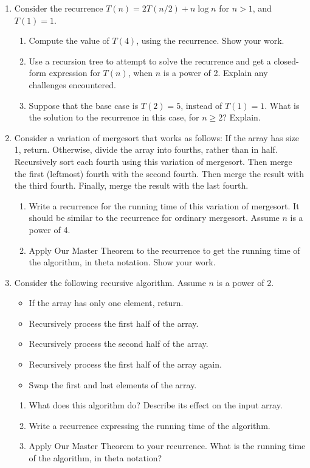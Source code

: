 \documentclass{article}
\begin{document}
\begin{enumerate}
    \item Consider the recurrence $T(n) = 2T(n/2) + n \log n$ for $n > 1$, and $T(1) = 1$.
    \begin{enumerate}
        \item Compute the value of $T(4)$, using the recurrence. Show your work.
        \item Use a recursion tree to attempt to solve the recurrence and get a closed-form expression for $T(n)$, when $n$ is a power of 2.  Explain any challenges encountered.
        \item Suppose that the base case is $T(2) = 5$, instead of $T(1) = 1$. What is the solution to the recurrence in this case, for $n \ge 2$?  Explain.
    \end{enumerate}

    \item Consider a variation of mergesort that works as follows: If the array has size 1, return. Otherwise, divide the array into fourths, rather than in half. Recursively sort each fourth using this variation of mergesort. Then merge the first (leftmost) fourth with the second fourth. Then merge the result with the third fourth. Finally, merge the result with the last fourth.
    \begin{enumerate}
        \item Write a recurrence for the running time of this variation of mergesort. It should be similar to the recurrence for ordinary mergesort. Assume $n$ is a power of 4.
        \item Apply Our Master Theorem to the recurrence to get the running time of the algorithm, in theta notation. Show your work.
    \end{enumerate}

    \item Consider the following recursive algorithm. Assume $n$ is a power of 2.
    \begin{itemize}
        \item If the array has only one element, return.
        \item Recursively process the first half of the array.
        \item Recursively process the second half of the array.
        \item Recursively process the first half of the array again.
        \item Swap the first and last elements of the array.
    \end{itemize}
    \begin{enumerate}
        \item  What does this algorithm do? Describe its effect on the input array.
        \item Write a recurrence expressing the running time of the algorithm.
        \item Apply Our Master Theorem to your recurrence. What is the running time of the algorithm, in theta notation?
    \end{enumerate}



\end{enumerate}
\end{document}
